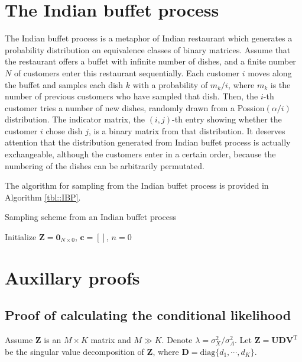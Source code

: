 \documentclass{article}
\begin{document}
\newpage
\begin{appendices}
  \section{The Indian buffet process}\label{sec::IBP}
  The Indian buffet process is a metaphor of Indian restaurant which generates a probability distribution on equivalence classes of binary matrices. Assume that the restaurant offers a buffet with infinite number of dishes, and a finite number $N$ of customers enter this restaurant sequentially. Each customer $i$ moves along the buffet and samples each dish $k$ with a probability of $m_k/i$, where $m_k$ is the number of previous customers who have sampled that dish. Then, the $i$-th customer tries a number of new dishes, randomly drawn from a Possion$(\alpha / i)$ distribution. The indicator matrix, the $(i,j)$-th entry showing whether the customer $i$ chose dish $j$, is a binary matrix from that distribution. It deserves attention that the distribution generated from Indian buffet process is actually exchangeable, although the customers enter in a certain order, because the numbering of the dishes can be arbitrarily permutated.

  The algorithm for sampling from the Indian buffet process is provided in Algorithm \ref{tbl::IBP}.
 
  \begin{algorithm}
    \caption{Sampling scheme from an Indian buffet process}
    \label{tbl::IBP}
    Initialize $\mathbf{Z} = \mathbf{0}_{N\times 0}$, $\boldsymbol{c} = []$, $n = 0$\;
  \end{algorithm}

  \section{Auxillary proofs}
  \subsection{Proof of calculating the conditional likelihood}\label{app::proof1}
    Assume $\mathbf{Z}$ is an $M\times K$ matrix and $M\gg K$. Denote $\lambda = \sigma_X^2 / \sigma_A^2$.
    Let $\mathbf{Z} = \mathbf{U}\mathbf{D}\mathbf{V}^\mathrm{T}$ be the singular value decomposition of $\mathbf{Z}$, where $\mathbf{D} = \mathrm{diag}\{d_1,\cdots, d_K\}$. 


\end{appendices}
\end{document}
